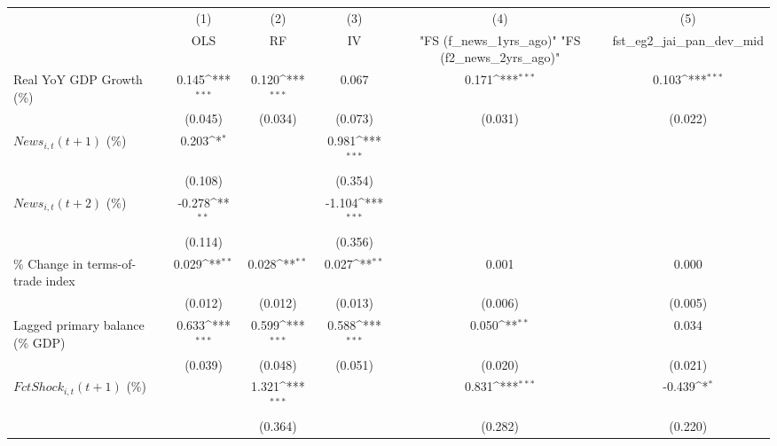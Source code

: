 {
\def\sym#1{\ifmmode^{#1}\else\(^{#1}\)\fi}
\begin{tabular}{l*{5}{c}}
\toprule
                    &\multicolumn{1}{c}{(1)}&\multicolumn{1}{c}{(2)}&\multicolumn{1}{c}{(3)}&\multicolumn{1}{c}{(4)}&\multicolumn{1}{c}{(5)}\\
                    &\multicolumn{1}{c}{OLS}&\multicolumn{1}{c}{RF}&\multicolumn{1}{c}{IV}&\multicolumn{1}{c}{ "FS (f_news_1yrs_ago)"  "FS (f2_news_2yrs_ago)" }&\multicolumn{1}{c}{fst_eg2_jai_pan_dev_mid}\\
\midrule
Real YoY GDP Growth (\%)&       0.145\sym{***}&       0.120\sym{***}&       0.067         &       0.171\sym{***}&       0.103\sym{***}\\
                    &     (0.045)         &     (0.034)         &     (0.073)         &     (0.031)         &     (0.022)         \\
\addlinespace
$ News_{i,t}(t+1)$ (\%)&       0.203\sym{*}  &                     &       0.981\sym{***}&                     &                     \\
                    &     (0.108)         &                     &     (0.354)         &                     &                     \\
\addlinespace
$ News_{i,t}(t+2)$ (\%)&      -0.278\sym{**} &                     &      -1.104\sym{***}&                     &                     \\
                    &     (0.114)         &                     &     (0.356)         &                     &                     \\
\addlinespace
\% Change in terms-of-trade index&       0.029\sym{**} &       0.028\sym{**} &       0.027\sym{**} &       0.001         &       0.000         \\
                    &     (0.012)         &     (0.012)         &     (0.013)         &     (0.006)         &     (0.005)         \\
\addlinespace
Lagged primary balance (\% GDP)&       0.633\sym{***}&       0.599\sym{***}&       0.588\sym{***}&       0.050\sym{**} &       0.034         \\
                    &     (0.039)         &     (0.048)         &     (0.051)         &     (0.020)         &     (0.021)         \\
\addlinespace
$ FctShock_{i,t}(t+1)$ (\%)&                     &       1.321\sym{***}&                     &       0.831\sym{***}&      -0.439\sym{*}  \\
                    &                     &     (0.364)         &                     &     (0.282)         &     (0.220)         \\

\end{tabular}}

